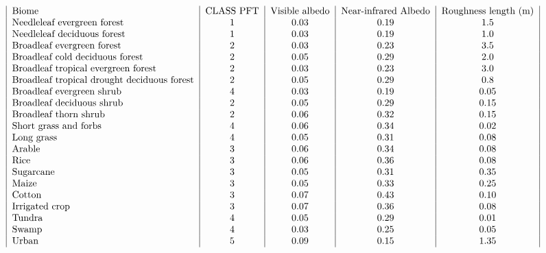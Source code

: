 \documentclass{article}
\begin{document}
{\[ \begin{tabular}{ | l | c | c | c | c | c | c | c | c | } Biome & CLASS PFT & Visible albedo & Near-infrared Albedo & Roughness length (m) \\ Needleleaf evergreen forest & 1 & 0.03 & 0.19 & 1.5 \\ Needleleaf deciduous forest & 1 & 0.03 & 0.19 & 1.0 \\ Broadleaf evergreen forest & 2 & 0.03 & 0.23 & 3.5 \\ Broadleaf cold deciduous forest & 2 & 0.05 & 0.29 & 2.0 \\ Broadleaf tropical evergreen forest & 2 & 0.03 & 0.23 & 3.0 \\ Broadleaf tropical drought deciduous forest & 2 & 0.05 & 0.29 & 0.8 \\ Broadleaf evergreen shrub & 4 & 0.03 & 0.19 & 0.05 \\ Broadleaf deciduous shrub & 2 & 0.05 & 0.29 & 0.15 \\ Broadleaf thorn shrub & 2 & 0.06 & 0.32 & 0.15 \\ Short grass and forbs & 4 & 0.06 & 0.34 & 0.02 \\ Long grass & 4 & 0.05 & 0.31 & 0.08 \\ Arable & 3 & 0.06 & 0.34 & 0.08 \\ Rice & 3 & 0.06 & 0.36 & 0.08 \\ Sugarcane & 3 & 0.05 & 0.31 & 0.35 \\ Maize & 3 & 0.05 & 0.33 & 0.25 \\ Cotton & 3 & 0.07 & 0.43 & 0.10 \\ Irrigated crop & 3 & 0.07 & 0.36 & 0.08 \\ Tundra & 4 & 0.05 & 0.29 & 0.01 \\ Swamp & 4 & 0.03 & 0.25 & 0.05 \\ Urban & 5 & 0.09 & 0.15 & 1.35 \\ \end{tabular} \]
\pagebreak

}
\end{document}
